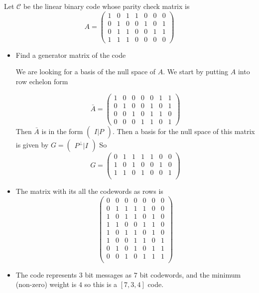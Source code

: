 \documentclass{homework}
\renewcommand{\C}{\mathcal{C}}
\begin{document}
\begin{problem}
  Let $\C$ be the linear binary code whose parity check matrix is
  \[
    A =
    \begin{pmatrix}
      1&0&1&1&0&0&0 \\
      0&1&0&0&1&0&1 \\
      0&1&1&0&0&1&1 \\
      1&1&1&0&0&0&0
    \end{pmatrix}
  \]
  \begin{itemize}
    \item Find a generator matrix of the code

      We are looking for a basis of the null space of $A$. We start by putting $A$ into
      row echelon form

      \[ \bar{A} =
        \begin{pmatrix}
          1&0&0&0&0&1&1 \\
          0&1&0&0&1&0&1 \\
          0&0&1&0&1&1&0 \\
          0&0&0&1&1&0&1
        \end{pmatrix}
      \]
      Then $\bar{A}$ is in the form
      $\begin{pmatrix}
        I | P
      \end{pmatrix}$. Then a basis for the null space of this matrix is given by
      $G = \begin{pmatrix}
        P^\perp | I
      \end{pmatrix}$
      So
      \[ G =
        \begin{pmatrix}
          0&1&1&1&1&0&0 \\
          1&0&1&0&0&1&0 \\
          1&1&0&1&0&0&1 \\
        \end{pmatrix}
      \]
    \item
      The matrix with its all the codewords as rows is
      \[
        \begin{pmatrix}
          0&0&0&0&0&0&0\\
          0&1&1&1&1&0&0\\
          1&0&1&1&0&1&0\\
          1&1&0&0&1&1&0\\
          1&0&1&1&0&1&0\\
          1&0&0&1&1&0&1\\
          0&1&0&1&0&1&1\\
          0&0&1&0&1&1&1\\
        \end{pmatrix}
      \]
    \item The code represents $3$ bit messages as $7$ bit codewords, and the
      minimum (non-zero) weight is $4$ so this is
      a $[7,3,4]$ code.


\end{itemize}
\end{problem}
\end{document}
